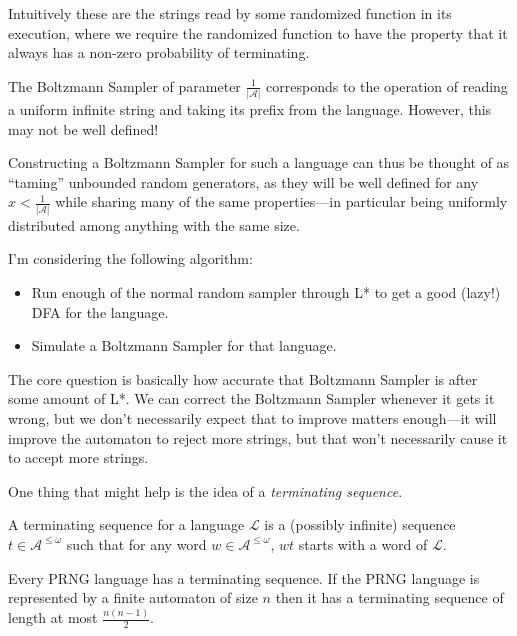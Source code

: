 Intuitively these are the strings read by some randomized function in its execution,
where we require the randomized function to have the property that it always has a non-zero probability of terminating.

The Boltzmann Sampler of parameter \(\frac{1}{|\mathcal{A}|}\) corresponds to the operation of reading a uniform infinite string and taking its prefix from the language.
However, this may not be well defined!

Constructing a Boltzmann Sampler for such a language can thus be thought of as ``taming'' unbounded random generators,
as they will be well defined for any \(x < \frac{1}{|\mathcal{A}|}\) while sharing many of the same properties---in
particular being uniformly distributed among anything with the same size.

I'm considering the following algorithm:

\begin{itemize}
\item Run enough of the normal random sampler through L* to get a good (lazy!) DFA for the language.
\item Simulate a Boltzmann Sampler for that language.
\end{itemize}

The core question is basically how accurate that Boltzmann Sampler is after some amount of L*.
We can correct the Boltzmann Sampler whenever it gets it wrong,
but we don't necessarily expect that to improve matters enough---it will improve the automaton to reject more strings,
but that won't necessarily cause it to accept more strings.

One thing that might help is the idea of a \emph{terminating sequence}.

\begin{definition}
A terminating sequence for a language \(\mathcal{L}\) is a (possibly infinite) sequence \(t \in \mathcal{A}^{\leq \omega}\) such that for any word \(w \in  \mathcal{A}^{\leq \omega}\), \(wt\) starts with a word of \(\mathcal{L}\).
\end{definition}

\begin{theorem}
Every PRNG language has a terminating sequence.
If the PRNG language is represented by a finite automaton of size \(n\) then it has a terminating sequence of length at most \(\frac{n(n - 1)}{2}\).
\end{theorem}

